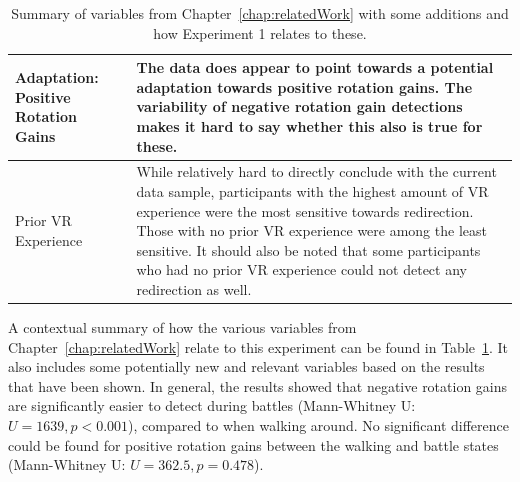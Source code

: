 \begin{table}[tbph!]
{\begin{tabularx}{\textwidth}{|X|X|}
Adaptation: Positive Rotation Gains & The data does appear to point towards a potential adaptation towards positive rotation gains. The variability of negative rotation gain detections makes it hard to say whether this also is true for these. \\
\hline
Prior VR Experience & While relatively hard to directly conclude with the current data sample, participants with the highest amount of VR experience were the most sensitive towards redirection. Those with no prior VR experience were among the least sensitive. It should also be noted that some participants who had no prior VR experience could not detect any redirection as well. \\
\hline
\end{tabularx}}
\caption[Experiment 1: Summary Over Contextual Variables in Relation To Detection Thresholds]{Summary of variables from Chapter~\ref{chap:relatedWork} with some additions and how Experiment 1 relates to these.}
\label{table:ex1VariableSummary}
\end{table}

A contextual summary of how the various variables from Chapter~\ref{chap:relatedWork} relate to this experiment can be found in Table~\ref{table:ex1VariableSummary}. It also includes some potentially new and relevant variables based on the results that have been shown. In general, the results showed that negative rotation gains are significantly easier to detect during battles (Mann-Whitney U: $U = 1639, p < 0.001$), compared to when walking around. No significant difference could be found for positive rotation gains between the walking and battle states (Mann-Whitney U: $U = 362.5, p = 0.478$). 